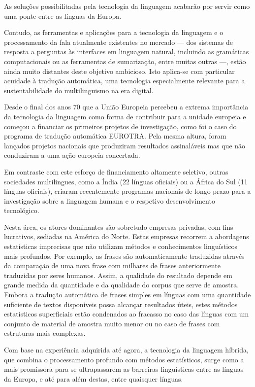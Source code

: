 \begin{multicols}{2}
As soluções possibilitadas pela tecnologia da linguagem acabarão por servir como uma ponte entre as línguas da Europa.


Contudo, as ferramentas e aplicações para a tecnologia da linguagem e o processamento da fala atualmente existentes no mercado
--- dos sistemas de resposta a perguntas às interfaces em linguagem natural, incluindo as gramáticas computacionais ou as ferramentas
de sumarização, entre muitas outras ---, estão ainda muito distantes deste objetivo ambicioso. 
Isto aplica-se com particular acuidade à tradução automática, uma tecnologia especialmente relevante para a sustentabilidade
do multilinguismo na era digital.

Desde o final dos anos 70 que a União Europeia percebeu a extrema importância da tecnologia da linguagem como forma de contribuir para a unidade europeia e começou a financiar os primeiros projetos de investigação, como foi o caso do programa de tradução automática EUROTRA. 
Pela mesma altura, foram lançados projetos nacionais que produziram resultados assinaláveis mas que não conduziram a uma ação europeia concertada. 

Em contraste com este esforço de financiamento altamente seletivo, outras sociedades multilingues, como a Índia (22 línguas oficiais) ou a África do Sul (11 línguas oficiais), criaram recentemente programas nacionais de longo prazo para a investigação sobre a linguagem humana e o respetivo desenvolvimento tecnológico.

Nesta área, os atores dominantes são sobretudo empresas privadas, com fins lucrativos, sediadas na América do Norte. 
Estas empresas recorrem a abordagens estatísticas imprecisas que não utilizam métodos e conhecimentos linguísticos mais profundos. Por exemplo, as frases são automaticamente traduzidas através da comparação de uma nova frase com milhares de frases anteriormente traduzidas por seres humanos. 
Assim, a qualidade do resultado depende em grande medida da quantidade e da qualidade do corpus que serve de amostra. Embora a tradução automática de frases simples em línguas com uma quantidade suficiente de textos disponíveis possa alcançar resultados úteis, estes métodos estatísticos superficiais estão condenados ao fracasso no caso das línguas com um conjunto de material de amostra muito menor ou no caso de frases com estruturas mais complexas. 

Com base na experiência adquirida até agora, a tecnologia da linguagem híbrida, que combina o processamento profundo com métodos estatísticos, 
surge como a mais promissora para se ultrapassarem as barreiras linguísticas
entre as línguas da Europa, e até para além destas, entre quaisquer línguas. 


\end{multicols}
